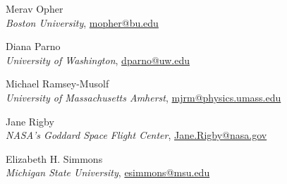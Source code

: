 \noindent Merav Opher\\
\indent \emph{Boston University}, \href{mailto:mopher@bu.edu}{mopher@bu.edu}\vspace*{\baselineskip}

\noindent Diana Parno\\
\indent \emph{University of Washington}, \href{mailto:dparno@uw.edu}{dparno@uw.edu}\vspace*{\baselineskip}

\noindent Michael Ramsey-Musolf\\
\indent \emph{University of Massachusetts Amherst}, \href{mailto:mjrm@physics.umass.edu}{mjrm@physics.umass.edu}\vspace*{\baselineskip}

\noindent Jane Rigby\\
\indent \emph{NASA's Goddard Space Flight Center}, \href{mailto:Jane.Rigby@nasa.gov}{Jane.Rigby@nasa.gov}\vspace*{\baselineskip}

\noindent Elizabeth H. Simmons\\
\indent \emph{Michigan State University}, \href{mailto:esimmons@msu.edu}{esimmons@msu.edu}
